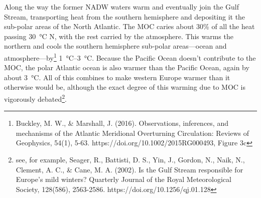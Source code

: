 {Along the way the former NADW waters warm and eventually join the Gulf Stream, transporting heat from the southern hemisphere and depositing it the sub-polar areas of the North Atlantic. The MOC caries about 30\% of all the heat passing \SI{30}{\celsius} N, with the rest carried by the atmosphere. This warms the northern and cools the southern hemisphere sub-polar areas---ocean and atmosphere---by\footnote{Buckley, M. W., \& Marshall, J. (2016). Observations, inferences, and mechanisms of the Atlantic Meridional Overturning Circulation: Reviews of Geophysics, 54(1), 5-63. https://doi.org/10.1002/2015RG000493, Figure 3c} \SIrange{1}{3}{\celsius}. Because the Pacific Ocean doesn't contribute to the MOC, the polar Atlantic ocean is also warmer than the Pacific Ocean, again by about \SI{3}{\celsius}. All of this combines to make western Europe warmer than it otherwise would be, although the exact degree of this warming due to MOC is vigorously debated\footnote{see, for example, Seager, R., Battisti, D. S., Yin, J., Gordon, N., Naik, N., Clement, A. C., \& Cane, M. A. (2002). Is the Gulf Stream responsible for Europe's mild winters? Quarterly Journal of the Royal Meteorological Society, 128(586), 2563-2586. https://doi.org/10.1256/qj.01.128}.  \\

}
